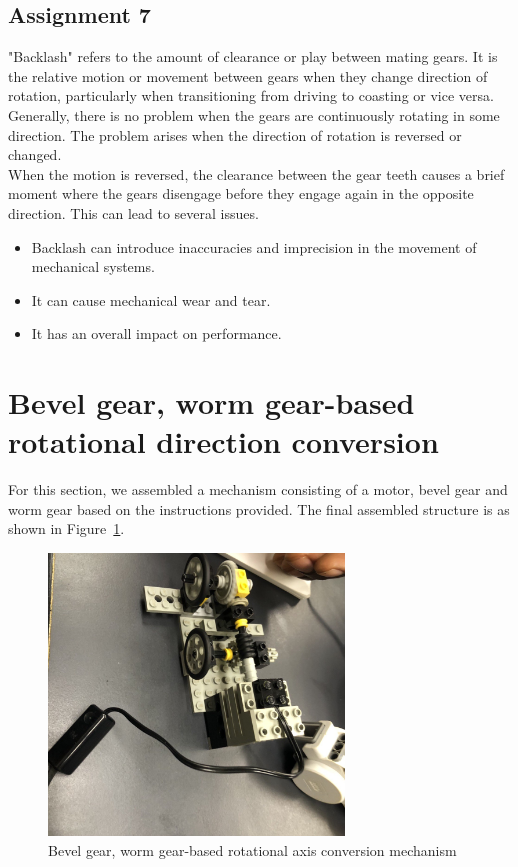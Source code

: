 \documentclass[12pt,a4paper]{report}
\begin{document}
\subsection{\textbf{Assignment 7}}
"Backlash" refers to the amount of clearance or play between mating gears. It is the relative motion or movement between 
gears when they change direction of rotation, particularly when transitioning from driving to coasting or vice versa.
Generally, there is no problem when the gears are continuously rotating in some direction. 
The problem arises when the direction of rotation is reversed or changed.\\
When the motion is reversed, the clearance between the gear teeth causes a brief moment where the gears disengage before 
they engage again in the opposite direction. This can lead to several issues.\\
\begin{itemize}
    \item Backlash can introduce inaccuracies and imprecision in the movement of mechanical systems. 
    \item It can cause mechanical wear and tear. 
    \item It has an overall impact on performance. 
\end{itemize}

\section{Bevel gear, worm gear-based rotational direction conversion}
For this section, we assembled a mechanism consisting of a motor, bevel gear and worm gear based on the instructions 
provided. The final assembled structure is as shown in Figure~\ref{fig:ass8}. 
\begin{figure}[htbp]
            \centering
    \includegraphics[width=0.7\textwidth]{figures/ass8}
    \caption{Bevel gear, worm gear-based rotational axis conversion mechanism}
    \label{fig:ass8}
\end{figure}
\end{document}
